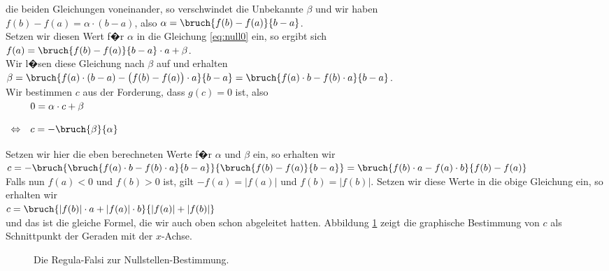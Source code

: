 die beiden Gleichungen voneinander, so verschwindet die Unbekannte $\beta$ und wir haben
\\[0.2cm]
\hspace*{1.3cm}
   $f(b) - f(a) = \alpha \cdot (b-a)$, \quad also \quad $\alpha = \bruch{f(b) - f(a)}{b-a}$.
\\[0.2cm]
Setzen wir diesen Wert f�r $\alpha$ in die Gleichung \ref{eq:null0} ein, so ergibt sich
\\[0.2cm]
\hspace*{1.3cm}
  $f(a) = \bruch{f(b) - f(a)}{b-a} \cdot a + \beta$.
\\[0.2cm]
Wir l�sen diese Gleichung nach $\beta$ auf und erhalten
\\[0.2cm]
\hspace*{1.3cm}
 $\beta = \bruch{f(a)\cdot (b-a) - \bigl(f(b) - f(a)\bigr)\cdot a}{b-a} = \bruch{f(a)\cdot b - f(b)\cdot a}{b-a}$. 
\\[0.2cm]
 Wir bestimmen $c$ aus der Forderung, dass $g(c) = 0$ ist, also
\\[0.2cm]
\hspace*{1.3cm}
$
\begin{array}[t]{ll}
                & 0 = \alpha \cdot c + \beta \\[0.4cm]
\Leftrightarrow & c = - \bruch{\beta}{\alpha} \\[0.4cm]
\end{array}
$
\\[0.2cm]
Setzen wir hier die eben berechneten Werte f�r $\alpha$ und $\beta$ ein, so erhalten wir
\\[0.2cm]
\hspace*{1.3cm}
$c = - \bruch{\bruch{f(a)\cdot b - f(b)\cdot a}{b-a}}{\bruch{f(b) - f(a)}{b-a}} = 
   \bruch{f(b)\cdot a - f(a)\cdot b}{f(b) - f(a)}$
\\[0.2cm]
Falls nun $f(a) < 0$ und $f(b) > 0$ ist, gilt $-f(a) = |f(a)|$ und $f(b) = |f(b)|$.
Setzen wir diese Werte in die obige Gleichung ein, so erhalten wir
\\[0.2cm]
\hspace*{1.3cm}
$c  = \bruch{|f(b)|\cdot a + |f(a)|\cdot b}{|f(a)| + |f(b)|}$
\\[0.2cm] 
und das ist die gleiche Formel, die wir auch oben schon abgeleitet hatten.
Abbildung \ref{fig:regula-falsi} zeigt die graphische Bestimmung von $c$
als Schnittpunkt der Geraden mit der $x$-Achse.
\begin{figure}[!h]
  \centering
   \caption{Die Regula-Falsi zur Nullstellen-Bestimmung.}
  \label{fig:regula-falsi}
\end{figure}



